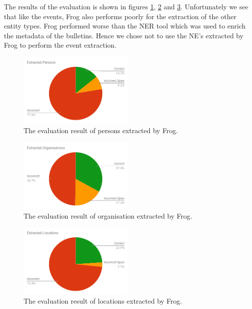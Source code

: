 \documentclass[a4paper, 10pt, conference]{ieeeconf}      %
\begin{document}
The results of the evaluation is shown in figures \ref{Person Frog evaluation}, \ref{Org Frog evaluation} and \ref{Loc Frog evaluation}. Unfortunately we see that like the events, Frog also performs poorly for the extraction of the other entity types. Frog performed worse than the NER tool which was used to enrich the metadata of the bulletins. Hence we chose not to use the NE's extracted by Frog to perform the event extraction.

\begin{figure}[]
  \centering
  \includegraphics[width= 0.5\textwidth]{FrogPersons}
  \caption{The evaluation result of persons extracted by Frog.}
  \label{Person Frog evaluation}
\end{figure}

\begin{figure}[]
  \centering
  \includegraphics[width= 0.5\textwidth]{FrogOrganisations}
  \caption{The evaluation result of organisation extracted by Frog.}
  \label{Org Frog evaluation}
\end{figure}

\begin{figure}[]
  \centering
  \includegraphics[width= 0.5\textwidth]{FrogLocations}
  \caption{The evaluation result of locations extracted by Frog.}
  \label{Loc Frog evaluation}
\end{figure}
\end{document}
